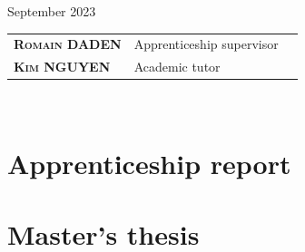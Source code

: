 \documentclass[11pt]{book}
\begin{document}
\begin{titlepage}
\begin{center}
	
			
			\vspace{1cm}
	
			September 2023
		\end{center}
		
		\vspace{1cm}
			
		
		\begin{center}
			\begin{tabular}{lll}
				 \textsc{\textbf{Romain DADEN}} & Apprenticeship supervisor \\
				 \textsc{\textbf{Kim NGUYEN}} & Academic tutor\\

				
			\end{tabular}\\[1cm]
		\end{center}

	\newpage
	\end{titlepage}



\pagestyle{fancy}

\fancyhead{}

\renewcommand{\chaptermark}[1]{\markboth{\textsc{#1}}{}}


\frontmatter

\tableofcontents
{}

\listoffigures
{}



\mainmatter

\setlength{\parskip}{.7em}

\titlespacing*{\section}{0pt}{.9em}{.8em}
\renewcommand{\baselinestretch}{1.1}


\fancyhead[RO]{\leftmark}
\fancyhead[LE]{\textsc{\chaptername~\thechapter}}




\part{Apprenticeship report}






\part{Master's thesis}







\pagebreak 
\appendix


\printbibliography
{}
\end{document}
